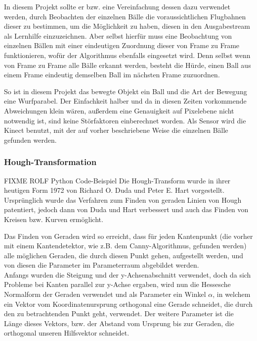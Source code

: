\documentclass[12pt,a4paper,ngerman]{scrartcl}
\begin{document}
In diesem Projekt sollte er bzw. eine Vereinfachung dessen dazu verwendet werden, durch Beobachten der einzelnen Bälle die voraussichtlichen Flugbahnen dieser zu bestimmen, um die Möglichkeit zu haben, diesen in den Ausgabestream als Lernhilfe einzuzeichnen. Aber selbst hierfür muss eine Beobachtung von einzelnen Bällen mit einer eindeutigen Zuordnung dieser von Frame zu Frame funktionieren, wofür der Algorithmus ebenfalls eingesetzt wird. Denn selbst wenn von Frame zu Frame alle Bälle erkannt werden, besteht die Hürde, einen Ball aus einem Frame eindeutig demselben Ball im nächsten Frame zuzuordnen.

So ist in diesem Projekt das bewegte Objekt ein Ball und die Art der Bewegung eine Wurfparabel. Der Einfachkeit halber und da in diesen Zeiten vorkommende Abweichungen klein wären, außerdem eine Genauigkeit auf Pixelebene nicht notwendig ist, sind keine Störfaktoren einberechnet worden. Als Sensor wird die Kinect benutzt, mit der auf vorher beschriebene Weise die einzelnen Bälle gefunden werden.

\subsubsection{Hough-Transformation}
\label{sec:hough}
{\color{red} FIXME ROLF Python Code-Beispiel}
Die Hough-Transform wurde in ihrer heutigen Form 1972 von Richard O. Duda und Peter E. Hart\cite{hough} vorgestellt.\\
Ursprünglich wurde das Verfahren zum Finden von geraden Linien von Hough patentiert, jedoch dann von Duda und Hart verbessert und auch das Finden von Kreisen bzw. Kurven ermöglicht.

Das Finden von Geraden wird so erreicht, dass für jeden Kantenpunkt (die vorher mit einem Kantendetektor, wie z.B. dem Canny-Algorithmus, gefunden werden) alle möglichen Geraden, die durch diesen Punkt gehen, aufgestellt werden, und von diesen die Parameter im Parameterraum abgebildet werden.\\
Anfangs wurden die Steigung und der y-Achsenabschnitt verwendet, doch da sich Probleme bei Kanten parallel zur y-Achse ergaben, wird nun die Hessesche Normalform der Geraden verwendet und als Parameter ein Winkel $\alpha$, in welchem ein Vektor vom Koordinatenursprung orthogonal eine Gerade schneidet, die durch den zu betrachtenden Punkt geht, verwendet. Der weitere Parameter ist die Länge dieses Vektors, bzw. der Abstand vom Ursprung bis zur Geraden, die orthogonal unseren Hilfsvektor schneidet.
\end{document}

